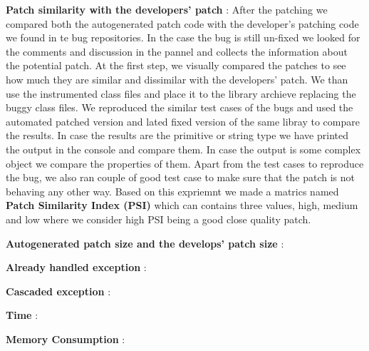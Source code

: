 \begin{mylist}

\item \textbf{Patch similarity with the developers' patch} : After the
patching we compared both the autogenerated patch code with the developer's patching code
we found in te bug repositories. In the case the bug is still un-fixed we looked
for the comments and discussion in the pannel and collects the information
about the potential patch. At the first step, we visually compared the patches
to see how much they are similar and dissimilar with the developers' patch. We
than use the instrumented class files and place it to the library archieve
replacing the buggy class files. We reproduced the similar test cases of the
bugs and used the automated patched version and lated fixed version of the same
libray to compare the results. In case the results are the primitive or string
type we have printed the output in the console and compare them. In case the
output is some complex object we compare the properties of them. Apart from the
test cases to reproduce the bug, we also ran couple of good test case to make
sure that the patch is not behaving any other way. Based on this expriemnt we
made a matrics named \textbf{Patch Similarity Index (PSI)} which can contains
three values, high, medium and low where we consider high PSI being a good close
quality patch.

\item \textbf{Autogenerated patch size and the develops' patch size} :

\item \textbf{Already handled exception} :

\item \textbf{Cascaded exception} :

\item \textbf{Time} :

\item \textbf{Memory Consumption} :
\end{mylist}


